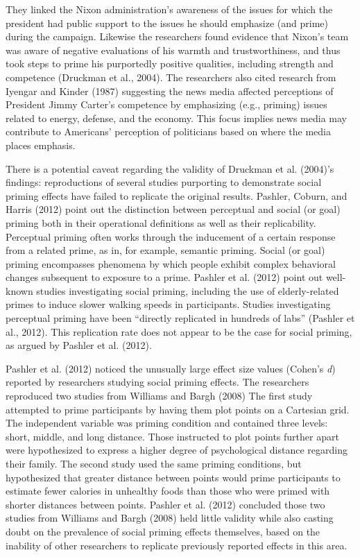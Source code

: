 \documentclass[english,,man]{apa6}
\begin{document}
They linked the Nixon administration's awareness of the issues for which the president had public support to the issues he should emphasize (and prime) during the campaign. Likewise the researchers found evidence that Nixon's team was aware of negative evaluations of his warmth and trustworthiness, and thus took steps to prime his purportedly positive qualities, including strength and competence (Druckman et al., 2004). The researchers also cited research from Iyengar and Kinder (1987) suggesting the news media affected perceptions of President Jimmy Carter's competence by emphasizing (e.g., priming) issues related to energy, defense, and the economy. This focus implies news media may contribute to Americans' perception of politicians based on where the media places emphasis.

There is a potential caveat regarding the validity of Druckman et al. (2004)'s findings: reproductions of several studies purporting to demonstrate social priming effects have failed to replicate the original results. Pashler, Coburn, and Harris (2012) point out the distinction between perceptual and social (or goal) priming both in their operational definitions as well as their replicability. Perceptual priming often works through the inducement of a certain response from a related prime, as in, for example, semantic priming. Social (or goal) priming encompasses phenomena by which people exhibit complex behavioral changes subsequent to exposure to a prime. Pashler et al. (2012) point out well-known studies investigating social priming, including the use of elderly-related primes to induce slower walking speeds in participants. Studies investigating perceptual priming have been \enquote{directly replicated in hundreds of labs} (Pashler et al., 2012). This replication rate does not appear to be the case for social priming, as argued by Pashler et al. (2012).

Pashler et al. (2012) noticed the unusually large effect size values (Cohen's \emph{d}) reported by researchers studying social priming effects. The researchers reproduced two studies from Williams and Bargh (2008) The first study attempted to prime participants by having them plot points on a Cartesian grid. The independent variable was priming condition and contained three levels: short, middle, and long distance. Those instructed to plot points further apart were hypothesized to express a higher degree of psychological distance regarding their family. The second study used the same priming conditions, but hypothesized that greater distance between points would prime participants to estimate fewer calories in unhealthy foods than those who were primed with shorter distances between points. Pashler et al. (2012) concluded those two studies from Williams and Bargh (2008) held little validity while also casting doubt on the prevalence of social priming effects themselves, based on the inability of other researchers to replicate previously reported effects in this area.
\end{document}
